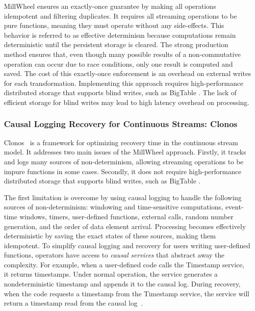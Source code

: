 MillWheel ensures an exactly-once guarantee by making all operations idempotent and filtering duplicates. It requires all streaming operations to be pure functions, meaning they must operate without any side-effects. This behavior is referred to as effective determinism \cite{akidau2018streaming} because computations remain deterministic until the persistent storage is cleared. The strong production method ensures that, even though many possible results of a non-commutative operation can occur due to race conditions, only one result is computed and saved. The cost of this exactly-once enforcement is an overhead on external writes for each transformation. Implementing this approach requires high-performance distributed storage that supports blind writes, such as BigTable \cite{chang2008bigtable}. The lack of efficient storage for blind writes may lead to high latency overhead on processing.

\subsubsection{Causal Logging Recovery for Continuous Streams: Clonos}

Clonos~\cite{silvestre2021clonos} is a framework for optimizing recovery time in the continuous stream model. It addresses two main issues of the MillWheel approach. Firstly, it tracks and logs many sources of non-determinism, allowing streaming operations to be impure functions in some cases. Secondly, it does not require high-performance distributed storage that supports blind writes, such as BigTable \cite{chang2008bigtable}.

The first limitation is overcome by using causal logging to handle the following sources of non-determinism: windowing and time-sensitive computations, event-time windows, timers, user-defined functions, external calls, random number generation, and the order of data element arrival. Processing becomes effectively deterministic by saving the exact states of these sources, making them idempotent. To simplify causal logging and recovery for users writing user-defined functions, operators have access to {\em causal services} that abstract away the complexity. For example, when a user-defined code calls the Timestamp service, it returns timestamps. Under normal operation, the service generates a nondeterministic timestamp and appends it to the causal log. During recovery, when the code requests a timestamp from the Timestamp service, the service will return a timestamp read from the causal log~\cite{silvestre2021clonos}.


